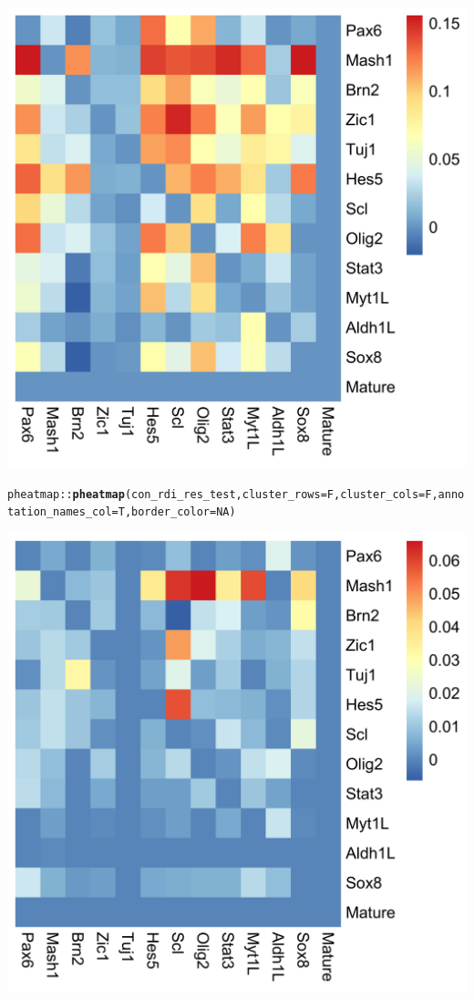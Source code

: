 \documentclass[10pt,oneside]{article}\usepackage[]{graphicx}\usepackage[]{color}
\makeatletter
\def\maxwidth{ %
  \ifdim\Gin@nat@width>\linewidth
    \linewidth
  \else
    \Gin@nat@width
  \fi
}
\newcommand{\hlnum}[1]{\textcolor[rgb]{0.686,0.059,0.569}{#1}}%
\newcommand{\hlopt}[1]{\textcolor[rgb]{0,0,0}{#1}}%
\newcommand{\hlstd}[1]{\textcolor[rgb]{0.345,0.345,0.345}{#1}}%
\newcommand{\hlkwc}[1]{\textcolor[rgb]{0.333,0.667,0.333}{#1}}%
\newcommand{\hlkwd}[1]{\textcolor[rgb]{0.737,0.353,0.396}{\textbf{#1}}}%
\newenvironment{kframe}{%
 \def\at@end@of@kframe{}%
 \ifinner\ifhmode%
  \def\at@end@of@kframe{\end{minipage}}%
  \begin{minipage}{\columnwidth}%
 \fi\fi%
 \def\FrameCommand##1{\hskip\@totalleftmargin \hskip-\fboxsep
 \colorbox{shadecolor}{##1}\hskip-\fboxsep
     \hskip-\linewidth \hskip-\@totalleftmargin \hskip\columnwidth}%
 \MakeFramed {\advance\hsize-\width
   \@totalleftmargin\z@ \linewidth\hsize
   \@setminipage}}%
 {\par\unskip\endMakeFramed%
 \at@end@of@kframe}
\newenvironment{knitrout}{}{} %
\makeatother
\begin{document}
\begin{knitrout}
{\centering \includegraphics[width=\maxwidth]{figure/plot_network-1} 

}


\begin{kframe}\begin{alltt}
\hlstd{pheatmap}\hlopt{::}\hlkwd{pheatmap}\hlstd{(con_rdi_res_test,} \hlkwc{cluster_rows} \hlstd{= F,} \hlkwc{cluster_cols} \hlstd{= F,} \hlkwc{annotation_names_col} \hlstd{= T,} \hlkwc{border_color} \hlstd{=} \hlnum{NA}\hlstd{)}
\end{alltt}
\end{kframe}

{\centering \includegraphics[width=\maxwidth]{figure/plot_network-2} 

}
\end{knitrout}
\end{document}
